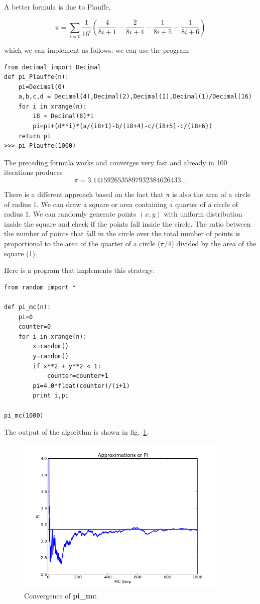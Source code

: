 \documentclass[justified,sixbynine]{tufte-book}
\theoremstyle{plain}%
\theoremstyle{definition}
\theoremstyle{remark}
\begin{document}
\begin{fullwidth}
A better formula is due to Plauffe,

\begin{equation}
\pi = \sum_{i=0} \frac{1}{16^i} \left(
\frac{4}{8i+1}-\frac{2}{8i+4}-\frac{1}{8i+5}-\frac{1}{8i+6}
\right)
\end{equation}

which we can implement as follows:
we can use the program
\begin{lstlisting}
from decimal import Decimal
def pi_Plauffe(n):
    pi=Decimal(0)
    a,b,c,d = Decimal(4),Decimal(2),Decimal(1),Decimal(1)/Decimal(16)
    for i in xrange(n):
        i8 = Decimal(8)*i
        pi=pi+(d**i)*(a/(i8+1)-b/(i8+4)-c/(i8+5)-c/(i8+6))
    return pi
>>> pi_Plauffe(1000)
\end{lstlisting}

The preceding formula works and converges very fast and already in 100 iterations produces
\begin{equation}
\pi = 3.1415926535897932384626433...
\end{equation}

There is a different approach based on the fact that $\pi$ is also the
area of a circle of radius 1. We can draw a square or area containing
a quarter of a circle of radius 1. We can randomly generate points $(x,y)$
with uniform distribution inside the square and check if the points fall inside
the circle. The ratio between the number of points that fall in
the circle over the total number of points is proportional to the area of
the quarter of a circle ($\pi /4$) divided by the area of the square (1).

Here is a program that implements this strategy:
\begin{lstlisting}
from random import *

def pi_mc(n):
    pi=0
    counter=0
    for i in xrange(n):
        x=random()
        y=random()
        if x**2 + y**2 < 1:
            counter=counter+1
        pi=4.0*float(counter)/(i+1)
        print i,pi

pi_mc(1000)
\end{lstlisting}

The output of the algorithm is shown in fig.~\ref{pi-plot}.

\begin{figure}[ht]
\centering\includegraphics[width=4in]{images/pi.png}
\caption{Convergence of {\bf pi\_mc}.\label{pi-plot}}
\end{figure}


\end{fullwidth}
\end{document}
